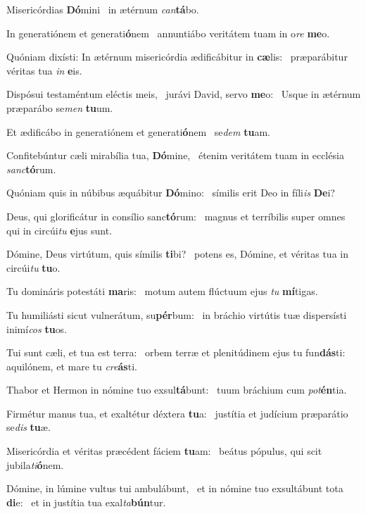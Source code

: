 \item Misericórdias \textbf{Dó}mini~\psstar{} in ætérnum \textit{can}\textbf{tá}bo.
\item In generatiónem et generati\textbf{ó}nem~\psstar{} annuntiábo veritátem tuam in o\textit{re} \textbf{me}o.
\item Quóniam dixísti: In ætérnum misericórdia ædificábitur in \textbf{cæ}lis:~\psstar{} præparábitur véritas tua \textit{in} \textbf{e}is.
\item Dispósui testaméntum eléctis meis,~\pscross{} jurávi David, servo \textbf{me}o:~\psstar{} Usque in ætérnum præparábo se\textit{men} \textbf{tu}um.
\item Et ædificábo in generatiónem et generati\textbf{ó}nem~\psstar{} se\textit{dem} \textbf{tu}am.
\item Confitebúntur cæli mirabília tua, \textbf{Dó}mine,~\psstar{} étenim veritátem tuam in ecclésia \textit{sanc}\textbf{tó}rum.
\item Quóniam quis in núbibus æquábitur \textbf{Dó}mino:~\psstar{} símilis erit Deo in fíli\textit{is} \textbf{De}i?
\item Deus, qui glorificátur in consílio sanc\textbf{tó}rum:~\psstar{} magnus et terríbilis super omnes qui in circúi\textit{tu} \textbf{e}jus sunt.
\item Dómine, Deus virtútum, quis símilis \textbf{ti}bi?~\psstar{} potens es, Dómine, et véritas tua in circúi\textit{tu} \textbf{tu}o.
\item Tu domináris potestáti \textbf{ma}ris:~\psstar{} motum autem flúctuum ejus \textit{tu} \textbf{mí}tigas.
\item Tu humiliásti sicut vulnerá\-tum, su\textbf{pér}bum:~\psstar{} in bráchio virtútis tuæ dispersísti inimí\textit{cos} \textbf{tu}os.
\item Tui sunt cæli, et tua est terra:~\pscross{} orbem terræ et plenitúdinem ejus tu fun\textbf{dás}ti:~\psstar{} aquilónem, et mare tu \textit{cre}\textbf{ás}ti.
\item Thabor et Hermon in nómine tuo exsul\textbf{tá}bunt:~\psstar{} tuum bráchium cum \textit{pot}\textbf{én}tia.
\item Firmétur manus tua, et exaltétur déxtera \textbf{tu}a:~\psstar{} justítia et judícium præparátio se\textit{dis} \textbf{tu}æ.
\item Misericórdia et véritas præcédent fáciem \textbf{tu}am:~\psstar{} beátus pópulus, qui scit jubila\textit{ti}\textbf{ó}nem.
\item Dómine, in lúmine vultus tui ambulábunt,~\pscross{} et in nómine tuo exsultábunt tota \textbf{di}e:~\psstar{} et in justítia tua exal\textit{ta}\textbf{bún}tur.
